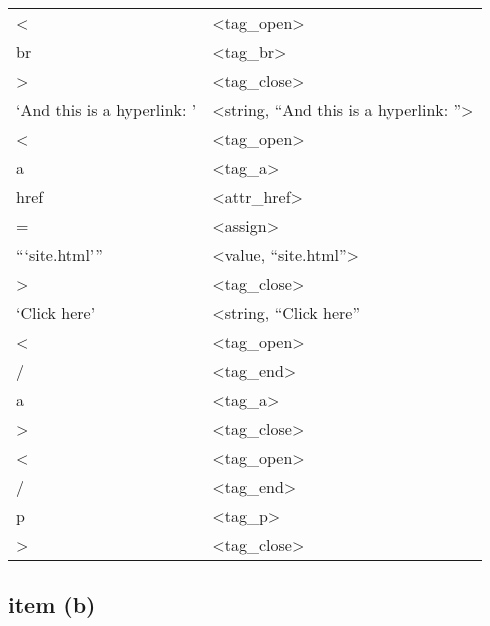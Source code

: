 \documentclass[10pt]{article}
\begin{document}
\begin{table}[H]
\begin{tabular}{p{6cm}l}
 <                            &  <tag\_open>                               \\
 br                           &  <tag\_br>                                 \\
 >                            &  <tag\_close>                              \\
 `And this is a hyperlink: '  &  <string, ``And this is a hyperlink: ''>  \\
 <                            &  <tag\_open>                               \\
 a                            &  <tag\_a>                                  \\
 href                         &  <attr\_href>                              \\
 =                            &  <assign>                                 \\
 ```site.html'''                &  <value, ``site.html''>                   \\
 >                            &  <tag\_close>                              \\
 `Click here'                 &  <string, ``Click here''                  \\
 <                            &  <tag\_open>                               \\
 /                            &  <tag\_end>                                \\
 a                            &  <tag\_a>                                  \\
 >                            &  <tag\_close>                              \\
 <                            &  <tag\_open>                               \\
 /                            &  <tag\_end>                                \\
 p                            &  <tag\_p>                                  \\
 >                            &  <tag\_close>                              \\
\end{tabular}
\end{table}
  
\subsection*{item (b)}
\end{document}
